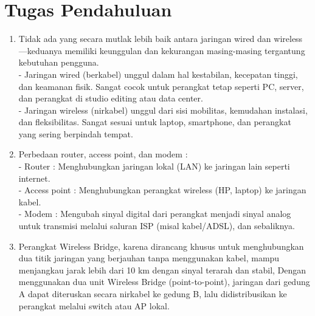 \section{Tugas Pendahuluan}
\begin{enumerate}
	\item Tidak ada yang secara mutlak lebih baik antara jaringan wired dan wireless—keduanya memiliki keunggulan dan kekurangan masing-masing tergantung kebutuhan pengguna. \\ - Jaringan wired (berkabel) unggul dalam hal kestabilan, kecepatan tinggi, dan keamanan fisik. Sangat cocok untuk perangkat tetap seperti PC, server, dan perangkat di studio editing atau data center. \\ - Jaringan wireless (nirkabel) unggul dari sisi mobilitas, kemudahan instalasi, dan fleksibilitas. Sangat sesuai untuk laptop, smartphone, dan perangkat yang sering berpindah tempat.
	\item Perbedaan router, access point, dan modem : \\ - Router : Menghubungkan jaringan lokal (LAN) ke jaringan lain seperti internet. \\ - Access point : Menghubungkan perangkat wireless (HP, laptop) ke jaringan kabel. \\ - Modem : Mengubah sinyal digital dari perangkat menjadi sinyal analog untuk transmisi melalui saluran ISP (misal kabel/ADSL), dan sebaliknya.
	\item Perangkat Wireless Bridge, karena dirancang khusus untuk menghubungkan dua titik jaringan yang berjauhan tanpa menggunakan kabel, mampu menjangkau jarak lebih dari 10 km dengan sinyal terarah dan stabil, Dengan menggunakan dua unit Wireless Bridge (point-to-point), jaringan dari gedung A dapat diteruskan secara nirkabel ke gedung B, lalu didistribusikan ke perangkat melalui switch atau AP lokal.
\end{enumerate}
